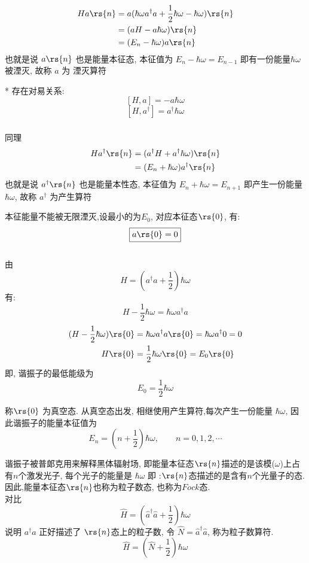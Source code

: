 \begin{frame}
\[ 
\begin{aligned}
  H a \rs{n}  &=  a( \hbar \omega   a ^\dagger a +  \frac{1}{2}\hbar \omega  - \hbar \omega ) \rs{n} \\ 
      &=  (aH - a \hbar \omega ) \rs{n} \\ 
      &=  (E_n -  \hbar \omega ) a\rs{n} \\ 
\end{aligned}
\]
也就是说 $a \rs{n} $ 也是能量本征态, 本征值为 $E_n -  \hbar \omega = E_{n-1} $ 即有一份能量$ \hbar \omega $ 被湮灭, 故称 $a$ 为 湮灭算符 \\ {\vspace*{0.3em}} 

* 存在对易关系:
\[ [H, a ] = - a \hbar \omega \] 
\[ [H, a^\dagger ] =  a^\dagger \hbar \omega \] 
\end{frame}

\begin{frame}
      \frametitle{}
    同理
      \[ 
        \begin{aligned}
          H a^\dagger \rs{n}  
              &=  (a^\dagger H + a^\dagger \hbar \omega ) \rs{n} \\ 
              &=  (E_n +  \hbar \omega ) a^\dagger \rs{n} 
        \end{aligned}
        \]
也就是说 $a^\dagger\rs{n} $ 也是能量本性态, 本征值为 $E_n + \hbar \omega = E_{n+1} $ 即产生一份能量$ \hbar \omega $,
故称 $a^\dagger$ 为产生算符
\end{frame}


\begin{frame}
本征能量不能被无限湮灭,设最小的为$E_0$, 对应本征态$\rs{0}$, 有:
\[ \boxed{a \rs{0}= 0 }\]
~~\\ 
由 \[H=(a ^\dagger a + \frac{1}{2})\hbar \omega\]  
有: 
\[H-\frac{1}{2}\hbar \omega=\hbar \omega a ^\dagger a \] 
\[ 
\begin{aligned}
(H-\frac{1}{2}\hbar \omega) \rs{0} &= \hbar \omega a ^\dagger a \rs{0} = \hbar \omega a ^\dagger 0 = 0 \\ 
H \rs{0} &= \frac{1}{2}\hbar \omega \rs{0}=E_0 \rs{0} 
\end{aligned}
\] 
即, 谐振子的最低能级为
\[ \boxed{E_0=\dfrac{1}{2}\hbar \omega} \]
\end{frame}


\begin{frame}
称$\rs{0}$ 为真空态. 从真空态出发, 相继使用产生算符,每次产生一份能量 $ \hbar \omega$, 因此谐振子的能量本征值为
\[\boxed{E_n = (n+\frac{1}{2})\hbar \omega, \qquad n=0,1,2, \cdots}  \] 

谐振子被普郞克用来解释黑体辐射场, 即能量本征态$\rs{n}$描述的是该模($\omega$)上占有$n$个激发光子, 每个光子的能量是 $\hbar \omega$ 即 :$\rs{n}$态描述的是含有$n$个光量子的态. 因此,能量本征态$\rs{n}$也称为粒子数态, 也称为$Fock$态. \\

对比 
\[  \hat{H}= \left(\hat{a}^\dagger \hat{a} + \frac{1 }{2}\right) \hbar \omega \]
说明 $a^\dagger a$ 正好描述了 $\rs{n}$态上的粒子数, 令 $\hat{N}=\hat{a}^\dagger \hat{a}$, 称为粒子数算符.
\[ \hat{H}= \left(\hat{N} + \frac{1 }{2}\right) \hbar \omega \] 
\end{frame}

